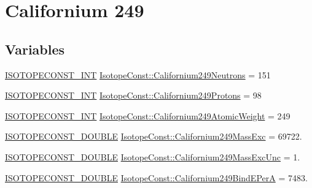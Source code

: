 \hypertarget{group___isotope_const-_californium-_cf249}{}\section{Californium 249}
\label{group___isotope_const-_californium-_cf249}
\subsection*{Variables}
\begin{DoxyCompactItemize}
\item 
\mbox{\hyperlink{group___isotope_const-_macros_ga5f18360b3e99483a35c32d789e62621c}{I\+S\+O\+T\+O\+P\+E\+C\+O\+N\+S\+T\+\_\+\+I\+NT}} \mbox{\hyperlink{group___isotope_const-_californium-_cf249_ga93151d589e42926803211b4bcd5ed2f2}{Isotope\+Const\+::\+Californium249\+Neutrons}} = 151
\item 
\mbox{\hyperlink{group___isotope_const-_macros_ga5f18360b3e99483a35c32d789e62621c}{I\+S\+O\+T\+O\+P\+E\+C\+O\+N\+S\+T\+\_\+\+I\+NT}} \mbox{\hyperlink{group___isotope_const-_californium-_cf249_gaa8710be12f8be6077c0de2d03386c42b}{Isotope\+Const\+::\+Californium249\+Protons}} = 98
\item 
\mbox{\hyperlink{group___isotope_const-_macros_ga5f18360b3e99483a35c32d789e62621c}{I\+S\+O\+T\+O\+P\+E\+C\+O\+N\+S\+T\+\_\+\+I\+NT}} \mbox{\hyperlink{group___isotope_const-_californium-_cf249_ga6fa7897278c3f6918135680eb1596fe0}{Isotope\+Const\+::\+Californium249\+Atomic\+Weight}} = 249
\item 
\mbox{\hyperlink{group___isotope_const-_macros_ga8f45a7272ce02c0b4c65c44636ed719a}{I\+S\+O\+T\+O\+P\+E\+C\+O\+N\+S\+T\+\_\+\+D\+O\+U\+B\+LE}} \mbox{\hyperlink{group___isotope_const-_californium-_cf249_gad29bda6d91e6079283a8fc2c3632b5a1}{Isotope\+Const\+::\+Californium249\+Mass\+Exc}} = 69722.
\item 
\mbox{\hyperlink{group___isotope_const-_macros_ga8f45a7272ce02c0b4c65c44636ed719a}{I\+S\+O\+T\+O\+P\+E\+C\+O\+N\+S\+T\+\_\+\+D\+O\+U\+B\+LE}} \mbox{\hyperlink{group___isotope_const-_californium-_cf249_gad661e71a37907f57a0f86ba9ce79ab3e}{Isotope\+Const\+::\+Californium249\+Mass\+Exc\+Unc}} = 1.
\item 
\mbox{\hyperlink{group___isotope_const-_macros_ga8f45a7272ce02c0b4c65c44636ed719a}{I\+S\+O\+T\+O\+P\+E\+C\+O\+N\+S\+T\+\_\+\+D\+O\+U\+B\+LE}} \mbox{\hyperlink{group___isotope_const-_californium-_cf249_gaa965858ee5d139be47ee9a37759542ab}{Isotope\+Const\+::\+Californium249\+Bind\+E\+PerA}} = 7483.

\end{DoxyCompactItemize}
